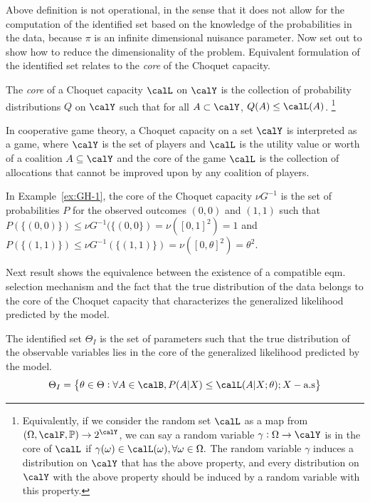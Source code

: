 Above definition is not operational, in the sense that it does not allow for the computation of the identified set based on the knowledge of the probabilities in the data, because $\pi$ is an infinite dimensional nuisance parameter. Now set out to show how to reduce the dimensionality of the problem. Equivalent formulation of the identified set relates to the \emph{core} of the Choquet capacity.
\begin{definition}
	\label{def:GH-5}
	The \emph{core} of a Choquet capacity $\calL$ on $\calY$ is the collection of probability distributions $Q$ on $\calY$ such that for all $A\subset \calY$, $Q(A) \leq \calL(A)$.
	\footnote{Equivalently, if we consider the random set $\calL$ as a map from $(\Omega, \calF, \mathbb{P}) \rightarrow 2^\calY$, we can say a random variable $\gamma:\Omega \rightarrow \calY$ is in the core of $\calL$ if $\gamma(\omega) \in \calL(\omega), \forall \omega \in \Omega.$ The random variable $\gamma$ induces a distribution on $\calY$ that has the above property, and every distribution on $\calY$ with the above property should be induced by a random variable with this property.}
\end{definition}
In cooperative game theory, a Choquet capacity on a set $\calY$ is interpreted as a game, where $\calY$ is the set of players and $\calL$ is the utility value or worth of a coalition $A\subseteq\calY$ and the core of the game $\calL$ is the collection of allocations that cannot be improved upon by any coalition of players.

In Example~\ref{ex:GH-1}, the core of the Choquet capacity $\nu G^{-1}$ is the set of probabilities $P$ for the observed outcomes $(0,0)$ and $(1,1)$ such that $P(\{(0,0)\}) \leq \nu G^{-1}(\{(0,0\}) = \nu([0,1]^2) =1$ and $P(\{(1,1)\}) \leq \nu G^{-1}(\{(1,1)\}) = \nu([0,\theta]^2) = \theta^2$.

Next result shows the equivalence between the existence of a compatible eqm. selection mechanism and the fact that the true distribution of the data belongs to the core of the Choquet capacity that characterizes the generalized likelihood predicted by the model.

\begin{theorem}
	\label{thm:GH-1}
	The identified set $\Theta_I$ is the set of parameters such that the true distribution of the observable variables lies in the core of the generalized likelihood predicted by the model.
	\[\Theta_I = \left\{\theta \in \Theta: \forall A \in \calB, P(A|X) \leq \calL(A|X;\theta); X-\text{a.s}\right\}\]
\end{theorem}

